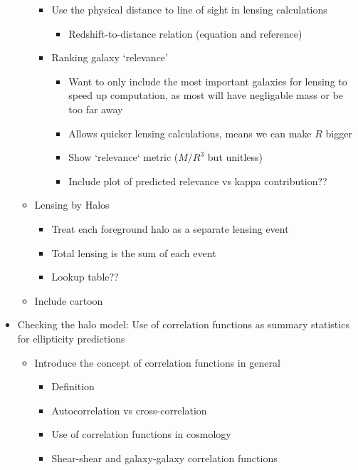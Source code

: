 \documentclass[%
 reprint,
 amsmath,amssymb,
 aps,
]{revtex4-1}
\begin{document}
\begin{itemize}
\begin{itemize}
\begin{itemize}
        \item Use the physical distance to line of sight in lensing calculations
            \begin{itemize}
            \item Redshift-to-distance relation (equation and reference)
            \end{itemize}
        \item Ranking galaxy `relevance'
            \begin{itemize}
            \item Want to only include the most important galaxies for lensing to speed up computation, as most will have negligable mass or be too far away
            \item Allows quicker lensing calculations, means we can make $R$ bigger
            \item Show `relevance` metric ($M/R^3$ but unitless)
            \item Include plot of predicted relevance vs kappa contribution??
            \end{itemize}
        \end{itemize}
    \item Lensing by Halos
        \begin{itemize}
        \item Treat each foreground halo as a separate lensing event
        \item Total lensing is the sum of each event
        \item Lookup table??
        \end{itemize}
    \item Include cartoon
    \end{itemize}
\item Checking the halo model: Use of correlation functions as summary statistics for ellipticity predictions
    \begin{itemize}
        \item Introduce the concept of correlation functions in general
            \begin{itemize}
            \item Definition
            \item Autocorrelation vs cross-correlation
            \item Use of correlation functions in cosmology
            \item Shear-shear and galaxy-galaxy correlation functions
                \begin{itemize}

\end{itemize}
\end{itemize}
\end{itemize}
\end{itemize}
\end{document}
